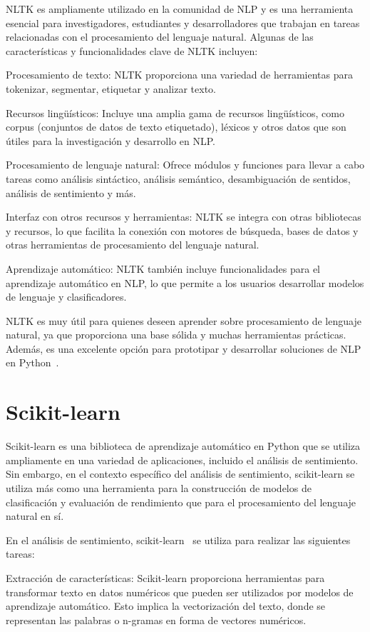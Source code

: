 NLTK es ampliamente utilizado en la comunidad de NLP y es una herramienta esencial para investigadores, estudiantes y desarrolladores que trabajan en tareas relacionadas con el procesamiento del lenguaje natural. Algunas de las características y funcionalidades clave de NLTK incluyen:

Procesamiento de texto: NLTK proporciona una variedad de herramientas para tokenizar, segmentar, etiquetar y analizar texto.

Recursos lingüísticos: Incluye una amplia gama de recursos lingüísticos, como corpus (conjuntos de datos de texto etiquetado), léxicos y otros datos que son útiles para la investigación y desarrollo en NLP.

Procesamiento de lenguaje natural: Ofrece módulos y funciones para llevar a cabo tareas como análisis sintáctico, análisis semántico, desambiguación de sentidos, análisis de sentimiento y más.

Interfaz con otros recursos y herramientas: NLTK se integra con otras bibliotecas y recursos, lo que facilita la conexión con motores de búsqueda, bases de datos y otras herramientas de procesamiento del lenguaje natural.

Aprendizaje automático: NLTK también incluye funcionalidades para el aprendizaje automático en NLP, lo que permite a los usuarios desarrollar modelos de lenguaje y clasificadores.

NLTK es muy útil para quienes deseen aprender sobre procesamiento de lenguaje natural, ya que proporciona una base sólida y muchas herramientas prácticas. Además, es una excelente opción para prototipar y desarrollar soluciones de NLP en Python~\cite{NLTK2}.


\section{Scikit-learn}
Scikit-learn es una biblioteca de aprendizaje automático en Python que se utiliza ampliamente en una variedad de aplicaciones, incluido el análisis de sentimiento. Sin embargo, en el contexto específico del análisis de sentimiento, scikit-learn se utiliza más como una herramienta para la construcción de modelos de clasificación y evaluación de rendimiento que para el procesamiento del lenguaje natural en sí.

En el análisis de sentimiento, scikit-learn~\cite{scikit-learn-sentiment1} se utiliza para realizar las siguientes tareas:

Extracción de características: Scikit-learn proporciona herramientas para transformar texto en datos numéricos que pueden ser utilizados por modelos de aprendizaje automático. Esto implica la vectorización del texto, donde se representan las palabras o n-gramas en forma de vectores numéricos.

